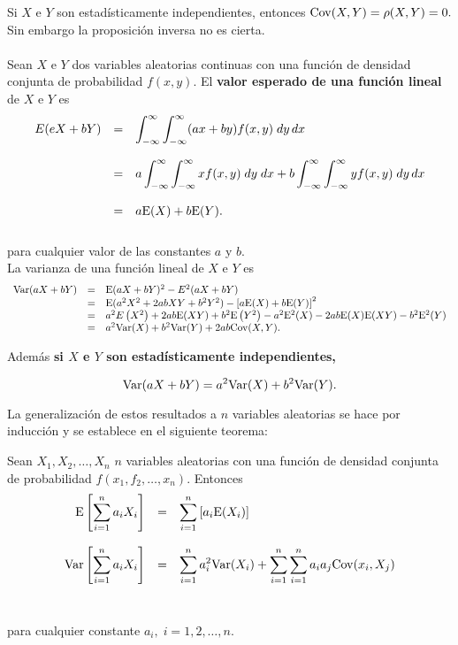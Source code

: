 Si $X$ e $Y$ son estadísticamente independientes, entonces $\mathrm{Cov}(X,Y)=\rho(X,Y)=0.$ Sin embargo la proposición inversa no es cierta.\\\\
Sean $X$ e $Y$ dos variables aleatorias continuas con una función de densidad conjunta de probabilidad $f(x,y)$. El \textbf{valor esperado de una función lineal} de $X$ e $Y$ es
$$\begin{array}{rcl}
    E(eX+bY) &=& \displaystyle \int_{-\infty}^\infty \int_{-\infty}^\infty (ax+by) f(x,y)\; dy\, dx\\\\
	     &=& a\displaystyle \int_{-\infty}^\infty \int_{-\infty}^\infty xf(x,y)\; dy\; dx + b\displaystyle \int_{-\infty}^\infty \int_{-\infty}^\infty yf(x,y)\; dy\, dx \\\\
	     &=& a\mathrm{E}(X) + b\mathrm{E}(Y).\\\\
\end{array}$$
para cualquier valor de las constantes $a$ y $b$.\\

La varianza de una función lineal de $X$ e $Y$ es
$$\begin{array}{rcl}
    \mathrm{Var}(aX+bY)&=&\mathrm{E}(aX+bY)^2 - E^2(aX+bY)\\
	       &=&\mathrm{E}(a^2X^2+2abXY + b^2Y^2)- \left[a\mathrm{E}(X)+b\mathrm{E}(Y)\right]^2\\
	       &=&a^2E\left(X^2\right)+2ab\mathrm{E}(XY)+b^2\mathrm{E}\left(Y^2\right)-a^2\mathrm{E}^2(X)-2ab\mathrm{E}(X)\mathrm{E}(XY)-b^2\mathrm{E}^2(Y)\\
	       &=&a^2\mathrm{Var}(X)+b^2\mathrm{Var}(Y)+2ab\mathrm{Cov}(X,Y).\\
\end{array}$$

Además \textbf{\boldmath si $X$ e $Y$ son estadísticamente independientes,}

\begin{tcolorbox}
    $$\mathrm{Var}(aX+bY)=a^2\mathrm{Var}(X)+b^2\mathrm{Var}(Y).$$
\end{tcolorbox}

La generalización de estos resultados a $n$ variables aleatorias se hace por inducción y se establece en el siguiente teorema:

\begin{teo}
    Sean $X_1,X_2,\ldots,X_n$ $n$ variables aleatorias con una función de densidad conjunta de probabilidad $f(x_1,f_2,\ldots,x_n)$. Entonces
    $$\begin{array}{rcl}
	\mathrm{E}\left[\displaystyle\sum_{i=1}^n a_iX_i\right]&=&\displaystyle \sum_{i=1}^n\left[a_i\mathrm{E}(X_i)\right]\\\\
	\mathrm{Var}\left[\displaystyle\sum_{i=1}^n a_iX_i\right]&=&\displaystyle \sum_{i=1}^n a_i^2 \mathrm{Var}(X_i)+\sum_{i=1}^n \sum_{i=1}^n a_ia_j \mathrm{Cov}(x_i,X_j)\\\\\
    \end{array}$$
    para cualquier constante $a_i,\; i=1,2,\ldots,n.$
\end{teo}


